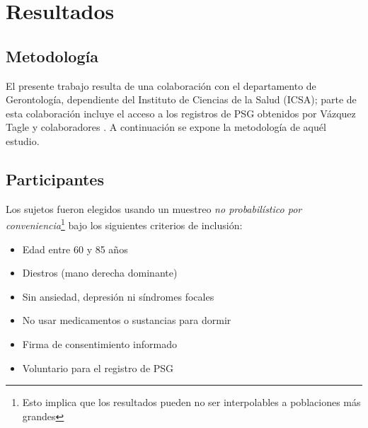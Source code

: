 

\chapter{Resultados}

\section{Metodología}

El presente trabajo resulta de una colaboración con el departamento de Gerontología, dependiente 
del Instituto de Ciencias de la Salud (ICSA); parte de esta colaboración incluye el acceso a los 
registros de PSG obtenidos por Vázquez Tagle y colaboradores \cite{VazquezTagle16}. 
A continuación se expone la metodología de aquél estudio.%

\section{Participantes}

Los sujetos fueron elegidos usando un muestreo \textit{no probabilístico por 
conveniencia}\footnote{Esto implica que los resultados pueden  no ser interpolables a poblaciones 
más grandes} bajo los siguientes criterios de inclusión:
\begin{itemize}
\item Edad entre 60 y 85 años
\item Diestros (mano derecha dominante)
\item Sin ansiedad, depresión ni síndromes focales
\item No usar medicamentos o sustancias para dormir
\item Firma de consentimiento informado
\item Voluntario para el registro de PSG
\end{itemize}

